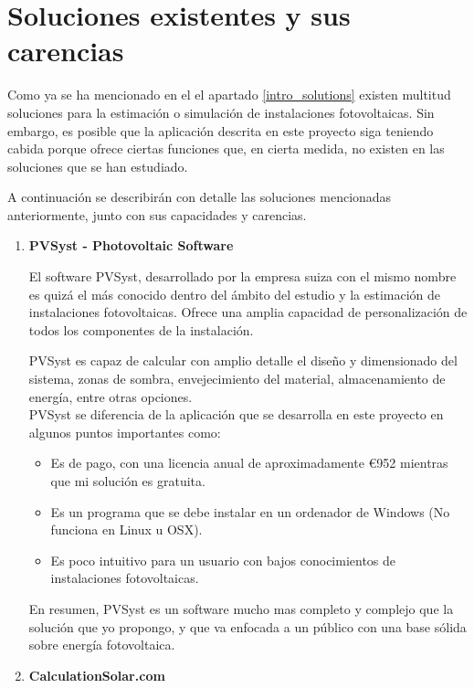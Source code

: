 \section{Soluciones existentes y sus carencias} \label{existing_solutions}

Como ya se ha mencionado en el el apartado \ref{intro_solutions}  existen multitud soluciones para la estimación o simulación de instalaciones fotovoltaicas. Sin embargo, es posible que la aplicación descrita en este proyecto siga teniendo cabida porque ofrece ciertas funciones que, en cierta medida, no existen en las soluciones que se han estudiado.

A continuación se describirán con detalle las soluciones mencionadas anteriormente, junto con sus capacidades y carencias.
\pagebreak

\begin{enumerate}
\item \textbf{PVSyst - Photovoltaic Software} \cite{sota_pvsyst}

El software PVSyst, desarrollado por la empresa suiza con el mismo nombre es quizá el más conocido dentro del ámbito del estudio y la estimación de instalaciones fotovoltaicas. Ofrece una amplia capacidad de personalización de todos los componentes de la instalación.

PVSyst es capaz de calcular con amplio detalle el diseño y dimensionado del sistema, zonas de sombra, envejecimiento del material, almacenamiento de energía, entre otras opciones.\\

PVSyst se diferencia de la aplicación que se desarrolla en este proyecto en algunos puntos importantes como:
	\begin{itemize}
		\item Es de pago, con una licencia anual de aproximadamente \euro{952} mientras que mi solución es gratuita.
		\item Es un programa que se debe instalar en un ordenador de Windows (No funciona en Linux u OSX).
		\item Es poco intuitivo para un usuario con bajos conocimientos de instalaciones fotovoltaicas.
	\end{itemize}
En resumen, PVSyst es un software mucho mas completo y complejo que la solución que yo propongo, y que va enfocada a un público con una base sólida sobre energía fotovoltaica.

\item \textbf{CalculationSolar.com} \cite{sota_calculationsolar}


\end{enumerate}
